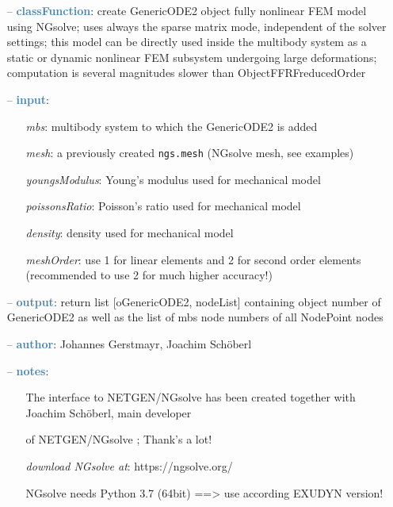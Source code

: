 \begin{itemize}[leftmargin=1.4cm]
\begin{itemize}[leftmargin=1.4cm]
\begin{itemize}[leftmargin=0.5cm]
\begin{itemize}[leftmargin=1.4cm]
\begin{itemize}[leftmargin=1.4cm]
\begin{itemize}[leftmargin=0.5cm]
\begin{itemize}[leftmargin=0.7cm]
  \item[--]  \textcolor{steelblue}{\bf classFunction}: create GenericODE2 object fully nonlinear FEM model using NGsolve; uses always the sparse matrix mode, independent of the solver settings; this model can be directly used inside the multibody system as a static or dynamic nonlinear FEM subsystem undergoing large deformations; computation is several magnitudes slower than ObjectFFRFreducedOrder  \item[--]  \textcolor{steelblue}{\bf input}: \vspace{-6pt}
  \begin{itemize}[leftmargin=1.2cm]
\setlength{\itemindent}{-0.7cm}
    \item[] {\it mbs}: multibody system to which the GenericODE2 is added
    \item[] {\it     mesh}: a previously created \texttt{ngs.mesh} (NGsolve mesh, see examples)
    \item[] {\it     youngsModulus}: Young's modulus used for mechanical model
    \item[] {\it     poissonsRatio}: Poisson's ratio used for mechanical model
    \item[] {\it     density}: density used for mechanical model
    \item[] {\it     meshOrder}: use 1 for linear elements and 2 for second order elements (recommended to use 2 for much higher accuracy!)
  \end{itemize}
  \item[--]  \textcolor{steelblue}{\bf output}: return list [oGenericODE2, nodeList] containing object number of GenericODE2 as well as the list of mbs node numbers of all NodePoint nodes  \item[--]  \textcolor{steelblue}{\bf author}: Johannes Gerstmayr, Joachim Sch\"oberl  \item[--]  \textcolor{steelblue}{\bf notes}: \vspace{-6pt}
  \begin{itemize}[leftmargin=1.2cm]
\setlength{\itemindent}{-0.7cm}
    \item[] The interface to NETGEN/NGsolve has been created together with Joachim Sch\"oberl, main developer
    \item[]   of NETGEN/NGsolve \cite{Schoeberl1997,NGsolve2014}; Thank's a lot!
    \item[] {\it   download NGsolve at}: https://ngsolve.org/
    \item[]   NGsolve needs Python 3.7 (64bit) ==> use according EXUDYN version!

\end{itemize}
\end{itemize}
\end{itemize}
\end{itemize}
\end{itemize}
\end{itemize}
\end{itemize}
\end{itemize}
